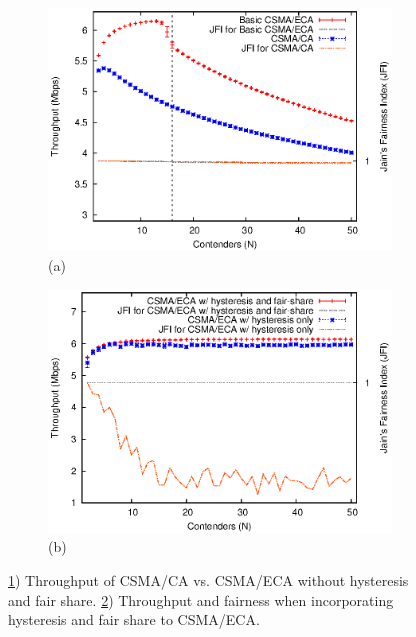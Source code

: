 \begin{figure}[htbp]
\centering
\begin{subfigure}{.5\textwidth}
  \centering
  \includegraphics[width=\linewidth]{ECA-vs-CA-FINAL.eps}
  \caption{(a)}
  \label{fig:DCFvsECA}
\end{subfigure}%
\begin{subfigure}{.5\textwidth}
  \centering
  \includegraphics[width=\linewidth]{ECA-w-enhancements-FINAL.eps}
  \caption{(b)}
  \label{fig:ECAPerformace}
\end{subfigure}
\caption{\ref{fig:DCFvsECA}) Throughput of CSMA/CA vs. CSMA/ECA without hysteresis and fair share. \ref{fig:ECAPerformace}) Throughput and fairness when incorporating hysteresis and fair share to CSMA/ECA.}
\label{fig:INFOCOMPoster}
\end{figure}

